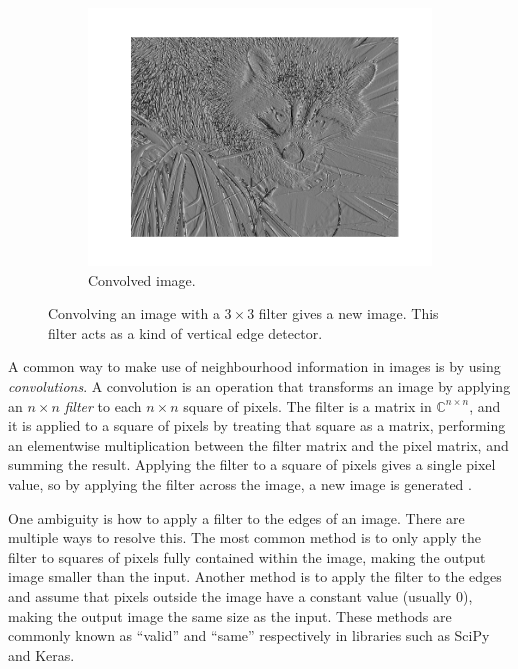 \begin{figure}
\begin{subfigure}[t]{0.3\textwidth}
                \includegraphics[width=\textwidth]{images/face_convolved.png}
                \caption{Convolved image.}
                \label{fig:convolution-face-convolved}
            \end{subfigure}
            \caption{Convolving an image with a $3 \times 3$ filter gives a new
                image. This filter acts as a kind of vertical edge detector.}
            \label{fig:convolved-face}
        \end{figure}

        A common way to make use of neighbourhood information in images is by
        using \emph{convolutions}. A convolution is an operation that transforms
        an image by applying an $n \times n$ \emph{filter} to each $n \times n$
        square of pixels. The filter is a matrix in $\mathbb{C}^{n \times n}$,
        and it is applied to a square of pixels by treating that square as a
        matrix, performing an elementwise multiplication between the filter
        matrix and the pixel matrix, and summing the result. Applying the filter
        to a square of pixels gives a single pixel value, so by applying the
        filter across the image, a new image is generated \citep{ludwig15}.

        One ambiguity is how to apply a filter to the edges of an image. There
        are multiple ways to resolve this. The most common method is to only
        apply the filter to squares of pixels fully contained within the image,
        making the output image smaller than the input. Another method is to
        apply the filter to the edges and assume that pixels outside the image
        have a constant value (usually 0), making the output image the same size
        as the input. These methods are commonly known as ``valid'' and ``same''
        respectively in libraries such as SciPy and Keras.

